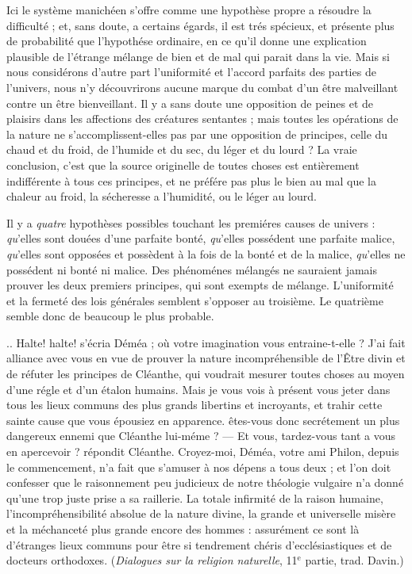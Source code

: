 Ici le système manichéen s’offre comme une hypothèse
propre a résoudre la difficulté ; et, sans doute, a certains
égards, il est trés spécieux, et présente plus de probabilité
que l’hypothése ordinaire, en ce qu’il donne une explication
plausible de l’étrange mélange de bien et de mal
qui parait dans la vie. Mais si nous considérons d’autre
part l'uniformité et l'accord parfaits des parties de l’univers,
nous n’y découvrirons aucune marque du combat
d’un être malveillant contre un être bienveillant. Il y a
sans doute une opposition de peines et de plaisirs dans les
affections des créatures sentantes ; mais toutes les opérations
de la nature ne s’accomplissent-elles pas par une
opposition de principes, celle du chaud et du froid, de
l'humide et du sec, du léger et du lourd ? La vraie conclusion,
c’est que la source originelle de toutes choses est
entièrement indifférente à tous ces principes, et ne préfére
pas plus le bien au mal que la chaleur au froid, la sécheresse
a l'humidité, ou le léger au lourd.

Il y a {\it quatre} hypothèses possibles touchant les premiéres
causes de univers : {\it qu}’elles sont douées d’une parfaite
bonté, {\it qu}’elles possédent une parfaite malice, {\it qu}’elles
sont opposées et possèdent à la fois de la bonté et de la
malice, {\it qu}’elles ne possédent ni bonté ni malice. Des
phénoménes mélangés ne sauraient jamais prouver les
deux premiers principes, qui sont exempts de mélange.
L’uniformité et la fermeté des lois générales semblent
s’opposer au troisième. Le quatrième semble donc de
beaucoup le plus probable.

.. Halte! halte! s’écria Déméa ; où votre imagination
vous entraine-t-elle ? J’ai fait alliance avec vous en vue
de prouver la nature incompréhensible de l’\^Etre divin et
de réfuter les principes de Cléanthe, qui voudrait mesurer
toutes choses au moyen d’une régle et d’un étalon humains.
Mais je vous vois à présent vous jeter dans tous les lieux
communs des plus grands libertins et incroyants, et trahir
cette sainte cause que vous épousiez en apparence. êtes-vous
donc secrétement un plus dangereux ennemi que
Cléanthe lui-méme ? — Et vous, tardez-vous tant a vous
en apercevoir ? répondit Cléanthe. Croyez-moi, Déméa,
votre ami Philon, depuis le commencement, n’a fait que
s’amuser à nos dépens a tous deux ; et l’on doit confesser
que le raisonnement peu judicieux de notre théologie
vulgaire n’a donné qu’une trop juste prise a sa raillerie. La
totale infirmité de la raison humaine, l’incompréhensibilité
absolue de la nature divine, la grande et universelle misère
et la méchanceté plus grande encore des hommes : assurément
ce sont là d’étranges lieux communs pour être si tendrement
chéris d’ecclésiastiques et de docteurs orthodoxes.
({\it Dialogues sur la religion naturelle}, 11$^\text{e}$ partie, trad. Davin.)

